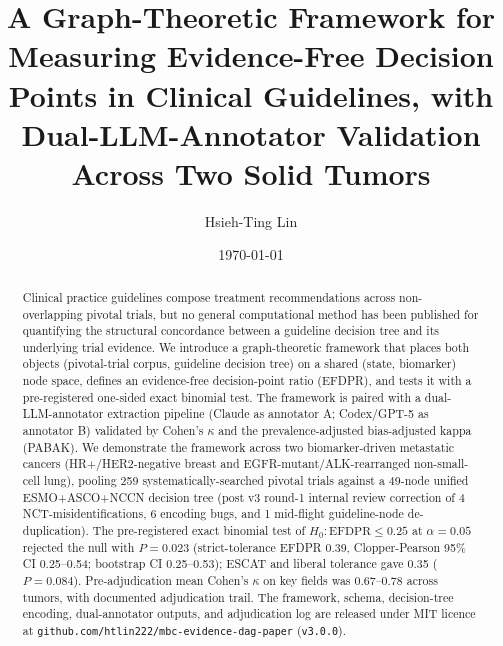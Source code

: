 \documentclass[11pt,a4paper]{article}
\title{\fontsize{15}{18}\bfseries\sffamily
A Graph-Theoretic Framework for Measuring Evidence-Free Decision Points in
Clinical Guidelines, with Dual-LLM-Annotator Validation Across Two Solid Tumors}
\author[1,*]{Hsieh-Ting Lin}
\affil[1]{Department of Hematology \& Medical Oncology, Koo Foundation Sun Yat-Sen Cancer Center, 125 Lide Rd., Beitou Dist., Taipei 11259, Taiwan. ORCID iD: 0009-0002-3974-4528.}
\affil[*]{Correspondence: \texttt{htlin222@kfsyscc.org}.}
\date{\today}
\begin{document}
\maketitle
\thispagestyle{empty}
\vspace{-1.5em}

\begin{abstract}
\noindent
Clinical practice guidelines compose treatment recommendations across non-overlapping pivotal trials, but no general computational method has been published for quantifying the structural concordance between a guideline decision tree and its underlying trial evidence. We introduce a graph-theoretic framework that places both objects (pivotal-trial corpus, guideline decision tree) on a shared (state, biomarker) node space, defines an evidence-free decision-point ratio (EFDPR), and tests it with a pre-registered one-sided exact binomial test. The framework is paired with a dual-LLM-annotator extraction pipeline (Claude as annotator A; Codex/GPT-5 as annotator B) validated by Cohen's $\kappa$ and the prevalence-adjusted bias-adjusted kappa (PABAK). We demonstrate the framework across two biomarker-driven metastatic cancers (HR+/HER2-negative breast and EGFR-mutant/ALK-rearranged non-small-cell lung), pooling 259 systematically-searched pivotal trials against a 49-node unified ESMO+ASCO+NCCN decision tree (post v3 round-1 internal review correction of 4 NCT-misidentifications, 6 encoding bugs, and 1 mid-flight guideline-node de-duplication). The pre-registered exact binomial test of $H_0: \mathrm{EFDPR} \le 0.25$ at $\alpha = 0.05$ rejected the null with $P = 0.023$ (strict-tolerance EFDPR 0.39, Clopper-Pearson 95\% CI 0.25--0.54; bootstrap CI 0.25--0.53); ESCAT and liberal tolerance gave 0.35 ($P = 0.084$). Pre-adjudication mean Cohen's $\kappa$ on key fields was 0.67--0.78 across tumors, with documented adjudication trail. The framework, schema, decision-tree encoding, dual-annotator outputs, and adjudication log are released under MIT licence at \texttt{github.com/htlin222/mbc-evidence-dag-paper} (\texttt{v3.0.0}).
\end{abstract}
\end{document}
